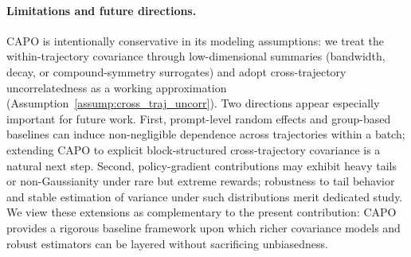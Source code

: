 \paragraph{Limitations and future directions.}
CAPO is intentionally conservative in its modeling assumptions: we treat the within-trajectory covariance through low-dimensional summaries (bandwidth, decay, or compound-symmetry surrogates) and adopt cross-trajectory uncorrelatedness as a working approximation (Assumption~\ref{assump:cross_traj_uncorr}).
Two directions appear especially important for future work.
First, prompt-level random effects and group-based baselines can induce non-negligible dependence across trajectories within a batch; extending CAPO to explicit block-structured cross-trajectory covariance is a natural next step.
Second, policy-gradient contributions may exhibit heavy tails or non-Gaussianity under rare but extreme rewards; robustness to tail behavior and stable estimation of variance under such distributions merit dedicated study.
We view these extensions as complementary to the present contribution: CAPO provides a rigorous baseline framework upon which richer covariance models and robust estimators can be layered without sacrificing unbiasedness.
